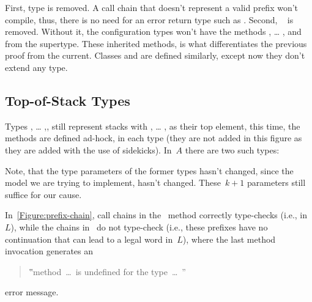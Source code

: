 First, type  is removed.
A call chain that doesn't represent a valid prefix won't compile,
  thus, there is no need for an error return type such as .
Second, ~ is removed.
Without it, the configuration types won't have the
  methods , … , and \cc{\$()} from the supertype.
These inherited methods, is what differentiates the previous proof from the current.
Classes  and  are defined similarly, except now they don't extend any type.

\subsection{Top-of-Stack Types}
Types , … ,, still represent stacks
  with , … , as their top element,
  this time, the methods are defined ad-hock, in each type
  (they are not added in this figure as they are added with the use of sidekicks).
In~$A$ there are two such types:

\begin{quote}
\end{quote}


Note, that the type parameters of the former types hasn't changed,
  since the model we are trying to implement, hasn't changed.
  These~$k+1$ parameters still suffice for our cause.

In~\cref{Figure:prefix-chain}, call chains in the~ method
  correctly type-checks (i.e., in~$L$), while the chains in~
  do not type-check (i.e., these prefixes have no continuation that can lead to a legal word in~$L$),
  where the last method invocation generates an
\begin{quote}
  ‟\textsf{method~…~is undefined for the type~…~}”
\end{quote}
  error message.

